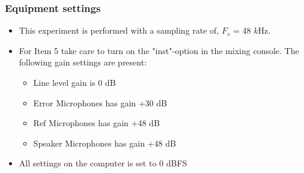 \subsubsection{Equipment settings}
\begin{itemize}
	\item This experiment is performed with a sampling rate of, $F_{s}$ = 48 $k$Hz. 
	\item For Item 5 take care to turn on the "inst"-option in the mixing console. The following gain settings are present: 		
	\begin{itemize}
		\item Line level gain is 0 dB
		\item Error Microphones has gain +30 dB
		\item Ref Microphones has gain +48 dB
		\item Speaker Microphones has gain +48 dB
	\end{itemize}
	\item All settings on the computer is set to 0 dBFS
\end{itemize}
	
	
